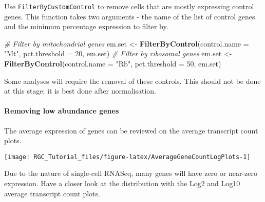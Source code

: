 \documentclass[]{article}
\newenvironment{Shaded}{\begin{snugshade}}{\end{snugshade}}
\newcommand{\CommentTok}[1]{\textcolor[rgb]{0.56,0.35,0.01}{\textit{#1}}}
\newcommand{\DataTypeTok}[1]{\textcolor[rgb]{0.13,0.29,0.53}{#1}}
\newcommand{\DecValTok}[1]{\textcolor[rgb]{0.00,0.00,0.81}{#1}}
\newcommand{\KeywordTok}[1]{\textcolor[rgb]{0.13,0.29,0.53}{\textbf{#1}}}
\newcommand{\NormalTok}[1]{#1}
\newcommand{\OperatorTok}[1]{\textcolor[rgb]{0.81,0.36,0.00}{\textbf{#1}}}
\newcommand{\StringTok}[1]{\textcolor[rgb]{0.31,0.60,0.02}{#1}}
\let\oldparagraph\paragraph
\renewcommand{\paragraph}[1]{\oldparagraph{#1}\mbox{}}
\begin{document}
Use \texttt{FilterByCustomControl} to remove cells that are mostly
expressing control genes. This function takes two arguments - the name
of the list of control genes and the minimum percentage expression to
filter by.

\begin{Shaded}
\begin{Highlighting}[]
\CommentTok{# Filter by mitochondrial genes}
\NormalTok{em.set <-}\StringTok{ }\KeywordTok{FilterByControl}\NormalTok{(}\DataTypeTok{control.name =} \StringTok{"Mt"}\NormalTok{, }\DataTypeTok{pct.threshold =} \DecValTok{20}\NormalTok{, em.set)}
\CommentTok{# Filter by ribosomal genes}
\NormalTok{em.set <-}\StringTok{ }\KeywordTok{FilterByControl}\NormalTok{(}\DataTypeTok{control.name =} \StringTok{"Rb"}\NormalTok{, }\DataTypeTok{pct.threshold =} \DecValTok{50}\NormalTok{, em.set)}
\end{Highlighting}
\end{Shaded}

Some analyses will require the removal of these controls. This should
not be done at this stage; it is best done after normalisation.

\hypertarget{removing-low-abundance-genes}{%
\paragraph{Removing low abundance
genes}\label{removing-low-abundance-genes}}

The average expression of genes can be reviewed on the average
transcript count plots.

\begin{Shaded}
\end{Shaded}

\begin{center}\texttt{[image: RGC\_Tutorial\_files/figure-latex/AverageGeneCountLogPlots-1]} \end{center}

Due to the nature of single-cell RNASeq, many genes will have zero or
near-zero expression. Have a closer look at the distribution with the
Log2 and Log10 average transcript count plots.
\end{document}
